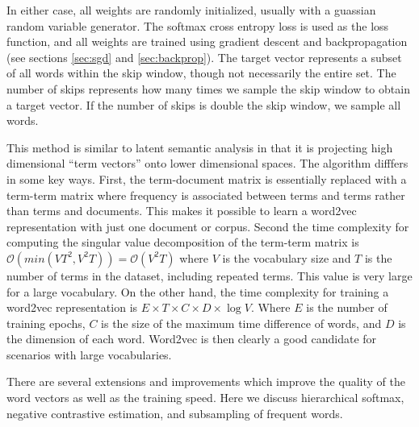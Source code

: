 In either case, all weights are randomly initialized, usually with a guassian random variable generator.  The softmax cross entropy loss is used as the loss function, and all weights are trained using gradient descent and backpropagation (see sections \ref{sec:sgd} and \ref{sec:backprop}).  The target vector represents a subset of all words within the skip window, though not necessarily the entire set.  The number of skips represents how many times we sample the skip window to obtain a target vector.  If the number of skips is double the skip window, we sample all words.

This method is similar to latent semantic analysis in that it is projecting high dimensional ``term vectors'' onto lower dimensional spaces.  The algorithm difffers in some key ways.  First, the term-document matrix is essentially replaced with a term-term matrix where frequency is associated between terms and terms rather than terms and documents.  This makes it possible to learn a word2vec representation with just one document or corpus.  Second the time complexity for computing the singular value decomposition of the term-term matrix is $\mathcal{O}(min(VT^2,V^2T)) = \mathcal{O}(V^2T)$ where $V$ is the vocabulary size and $T$ is the number of terms in the dataset, including repeated terms.  This value is very large for a large vocabulary.  On the other hand, the time complexity for training a word2vec representation is $E\times T\times C\times D\times \log V$.  Where $E$ is the number of training epochs, $C$ is the size of the maximum time difference of words, and $D$ is the dimension of each word.  Word2vec is then clearly a good candidate for scenarios with large vocabularies.

There are several extensions and improvements which improve the quality of the word vectors as well as the training speed. \cite{tm13} Here we discuss hierarchical softmax, negative contrastive estimation, and subsampling of frequent words.

